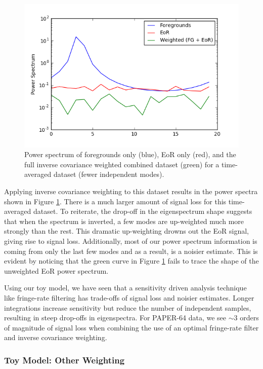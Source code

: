 \documentclass[preprint2,numberedappendix,tighten,twocolappendix]{aastex6}  %
\begin{document}
\begin{figure}
	\centering
	\includegraphics[trim={0.3cm 0.3cm 0.3cm 0.3cm},clip,width=\columnwidth]{plots/toy_sigloss7.png}
	\caption{Power spectrum of foregrounds only (blue), EoR only (red), and the full inverse covariance weighted combined dataset (green) for a time-averaged dataset (fewer independent modes).}
	\label{fig:toy_sigloss7}
\end{figure}

Applying inverse covariance weighting to this dataset results in the power spectra shown in Figure \ref{fig:toy_sigloss7}. There is a much larger amount of signal loss for this time-averaged dataset. To reiterate, the drop-off in the eigenspectrum shape suggests that when the spectrum is inverted, a few modes are up-weighted much more strongly than the rest. This dramatic up-weighting drowns out the EoR signal, giving rise to signal loss. Additionally, most of our power spectrum information is coming from only the last few modes and as a result, is a noisier estimate. This is evident by noticing that the green curve in Figure \ref{fig:toy_sigloss7} fails to trace the shape of the unweighted EoR power spectrum.

Using our toy model, we have seen that a sensitivity driven analysis technique like fringe-rate filtering has trade-offs of signal loss and noisier estimates. Longer integrations increase sensitivity but reduce the number of independent samples, resulting in steep drop-offs in eigenspectra. For PAPER-64 data, we see $\sim3$ orders of magnitude of signal loss when combining the use of an optimal fringe-rate filter and inverse covariance weighting. 

\subsubsection{Toy Model: Other Weighting}
\end{document}

